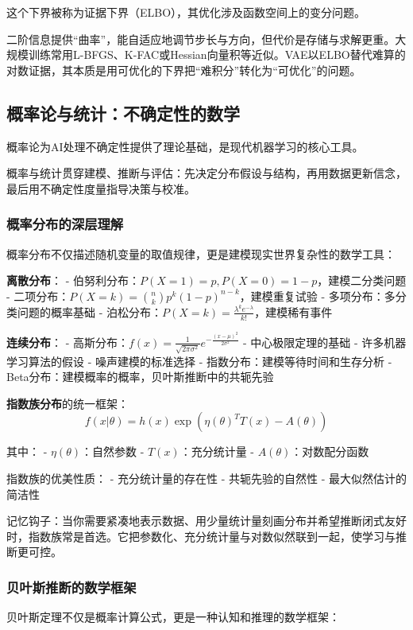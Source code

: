 这个下界被称为证据下界（ELBO），其优化涉及函数空间上的变分问题。

二阶信息提供“曲率”，能自适应地调节步长与方向，但代价是存储与求解更重。大规模训练常用L-BFGS、K-FAC或Hessian向量积等近似。VAE以ELBO替代难算的对数证据，其本质是用可优化的下界把“难积分”转化为“可优化”的问题。

\subsection{概率论与统计：不确定性的数学}

概率论为AI处理不确定性提供了理论基础，是现代机器学习的核心工具。

概率与统计贯穿建模、推断与评估：先决定分布假设与结构，再用数据更新信念，最后用不确定性度量指导决策与校准。

\subsubsection{概率分布的深层理解}

概率分布不仅描述随机变量的取值规律，更是建模现实世界复杂性的数学工具：

\textbf{离散分布}：
- 伯努利分布：$P(X=1) = p, P(X=0) = 1-p$，建模二分类问题
- 二项分布：$P(X=k) = \binom{n}{k}p^k(1-p)^{n-k}$，建模重复试验
- 多项分布：多分类问题的概率基础
- 泊松分布：$P(X=k) = \frac{\lambda^k e^{-\lambda}}{k!}$，建模稀有事件

\textbf{连续分布}：
- 高斯分布：$f(x) = \frac{1}{\sqrt{2\pi\sigma^2}}e^{-\frac{(x-\mu)^2}{2\sigma^2}}$
  - 中心极限定理的基础
  - 许多机器学习算法的假设
  - 噪声建模的标准选择
- 指数分布：建模等待时间和生存分析
- Beta分布：建模概率的概率，贝叶斯推断中的共轭先验

\textbf{指数族分布}的统一框架：
$$f(x|\theta) = h(x)\exp(\eta(\theta)^T T(x) - A(\theta))$$

其中：
- $\eta(\theta)$：自然参数
- $T(x)$：充分统计量
- $A(\theta)$：对数配分函数

指数族的优美性质：
- 充分统计量的存在性
- 共轭先验的自然性
- 最大似然估计的简洁性

记忆钩子：当你需要紧凑地表示数据、用少量统计量刻画分布并希望推断闭式友好时，指数族常是首选。它把参数化、充分统计量与对数似然联到一起，使学习与推断更可控。

\subsubsection{贝叶斯推断的数学框架}

贝叶斯定理不仅是概率计算公式，更是一种认知和推理的数学框架：

